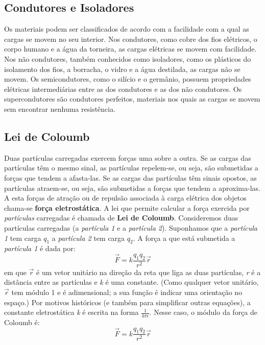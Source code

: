 \documentclass{article}
\begin{document}
\subsection{Condutores e Isoladores}
Os materiais podem ser classificados de acordo com a facilidade com a qual as cargas se movem no seu interior. Nos condutores, como cobre dos fios elétricos, o corpo humano e a água da torneira, as cargas elétricas se movem com facilidade. Nos não condutores, também conhecidos como isoladores, como os plásticos do isolamento dos fios, a borracha, o vidro e a água destilada, as cargas não se movem. Os semicondutores, como o silício e o germânio, possuem propriedades elétricas intermediárias entre as dos condutores e as dos não condutores. Os supercondutores são condutores perfeitos, materiais nos quais as cargas se movem sem encontrar nenhuma resistência.
\subsection{Lei de Coloumb}
Duas partículas carregadas exercem forças uma sobre a outra. Se as cargas das partículas têm o mesmo sinal, as partículas repelem-se, ou seja, são submetidas a forças que tendem a afasta-las. Se as cargas das partículas têm sinais opostos, as partículas atraem-se, ou seja, são submetidas a forças que tendem a aproxima-las.
A esta forças de atração ou de repulsão associada à carga elétrica dos objetos chama-se \textbf{força eletrostática}. A lei que permite calcular a força exercida por \textit{partículas} carregadas é chamada de \textbf{Lei de Coloumb}.
Consideremos duas partículas carregadas (a {\textit{partícula 1}} e a {\textit{partícula 2}}). Suponhamos que a \textit{partícula 1} tem carga \textit{$q_1$} a \textit{partícula 2} tem carga \textit{$q_2$}.
\newline
A força a que está submetida a \textit{partícula 1} é dada por:
\newline
\[ \vec{F} = k \frac{q_1 q_2}{r^2} \vec{r}\]
\newline
em que \(\vec{r}\) é um vetor unitário na direção da reta que liga as duas partículas, \textit{r} é a distância entre as partículas e \textit{k} é uma constante. (Como qualquer vetor unitário, \(\vec{r}\) tem módulo 1 e é adimensional; a sua função é indicar uma orientação no espaço.)
Por motivos históricos (e também para simplificar outras equações), a constante eletrostática \textit{k} é escrita na forma \(\frac{1}{4 \pi \epsilon}\). Nesse caso, o módulo da força de Coloumb é:
\newline
\[ \vec{F} = k \frac{q_1 q_2}{r^2} \vec{r}\]
\newline
\end{document}
